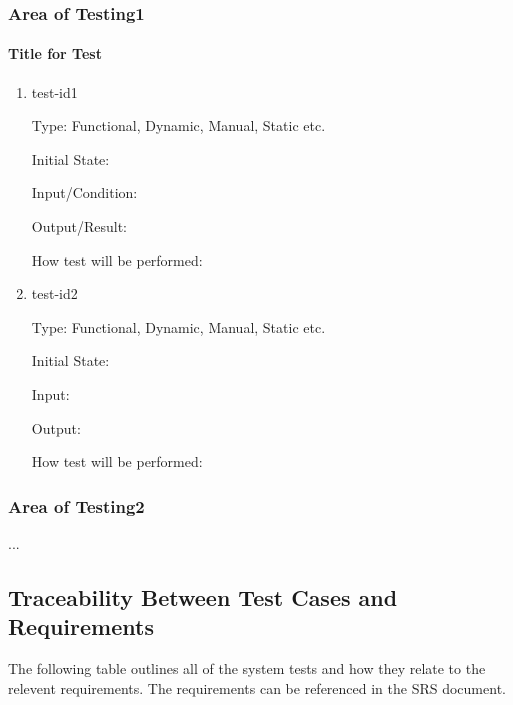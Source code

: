 \documentclass[12pt, titlepage]{article}
\begin{document}



\subsubsection{Area of Testing1}
		
\paragraph{Title for Test}

\begin{enumerate}

\item{test-id1\\}

Type: Functional, Dynamic, Manual, Static etc.
					
Initial State: 
					
Input/Condition: 
					
Output/Result: 
					
How test will be performed: 
					
\item{test-id2\\}

Type: Functional, Dynamic, Manual, Static etc.
					
Initial State: 
					
Input: 
					
Output: 
					
How test will be performed: 

\end{enumerate}

\subsubsection{Area of Testing2}

...

\subsection{Traceability Between Test Cases and Requirements}
The following table outlines all of the system tests and how they relate to the
relevent requirements. The requirements can be referenced in the SRS document.\\
\end{document}
